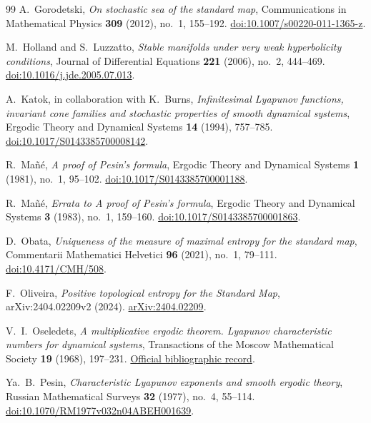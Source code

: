 \begin{thebibliography}{99}
A.~Gorodetski,
\emph{On stochastic sea of the standard map},
Communications in Mathematical Physics \textbf{309} (2012), no.~1, 155--192.
\href{https://doi.org/10.1007/s00220-011-1365-z}
{doi:10.1007/s00220-011-1365-z}.

M.~Holland and S.~Luzzatto,
\emph{Stable manifolds under very weak hyperbolicity conditions},
Journal of Differential Equations \textbf{221} (2006), no.~2, 444--469.
\href{https://doi.org/10.1016/j.jde.2005.07.013}{doi:10.1016/j.jde.2005.07.013}.

A.~Katok, in collaboration with K.~Burns,
\emph{Infinitesimal Lyapunov functions, invariant cone families and
stochastic properties of smooth dynamical systems},
Ergodic Theory and Dynamical Systems \textbf{14} (1994), 757--785.
\href{https://doi.org/10.1017/S0143385700008142}
{doi:10.1017/S0143385700008142}.

R.~Ma\~n\'e,
\emph{A proof of Pesin's formula},
Ergodic Theory and Dynamical Systems \textbf{1} (1981), no.~1, 95--102.
\href{https://doi.org/10.1017/S0143385700001188}
{doi:10.1017/S0143385700001188}.

R.~Ma\~n\'e,
\emph{Errata to A proof of Pesin's formula},
Ergodic Theory and Dynamical Systems \textbf{3} (1983), no.~1, 159--160.
\href{https://doi.org/10.1017/S0143385700001863}
{doi:10.1017/S0143385700001863}.

D.~Obata,
\emph{Uniqueness of the measure of maximal entropy for the standard map},
Commentarii Mathematici Helvetici \textbf{96} (2021), no.~1, 79--111.
\href{https://doi.org/10.4171/CMH/508}{doi:10.4171/CMH/508}.

F.~Oliveira,
\emph{Positive topological entropy for the Standard Map},
arXiv:2404.02209v2 (2024).
\href{https://arxiv.org/abs/2404.02209}{arXiv:2404.02209}.

V.~I.~Oseledets,
\emph{A multiplicative ergodic theorem.
Lyapunov characteristic numbers for dynamical systems},
Transactions of the Moscow Mathematical Society \textbf{19} (1968), 197--231.
\href{https://www.mathnet.ru/eng/mmo214}{Official bibliographic record}.

Ya.~B.~Pesin,
\emph{Characteristic Lyapunov exponents and smooth ergodic theory},
Russian Mathematical Surveys \textbf{32} (1977), no.~4, 55--114.
\href{https://doi.org/10.1070/RM1977v032n04ABEH001639}
{doi:10.1070/RM1977v032n04ABEH001639}.

\end{thebibliography}
